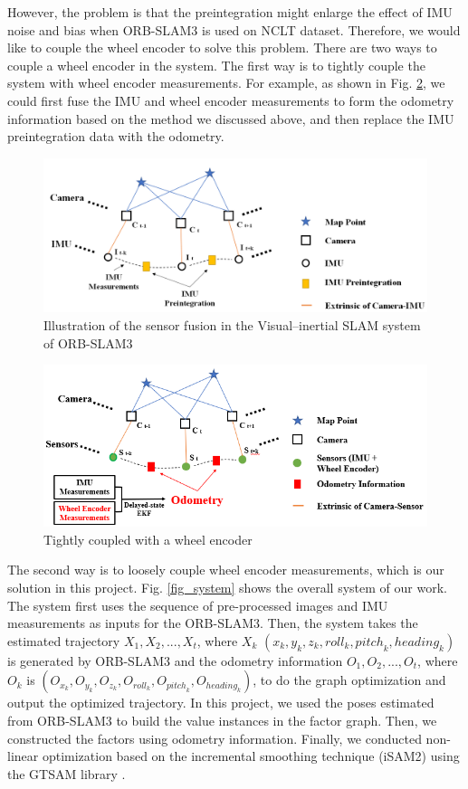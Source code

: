 \documentclass[letterpaper, 10 pt, conference]{ieeeconf}  %
\begin{document}
However, the problem is that the preintegration might enlarge the effect of IMU noise and bias when ORB-SLAM3 is used on NCLT dataset. Therefore, we would like to couple the wheel encoder to solve this problem. There are two ways to couple a wheel encoder in the system. The first way is to tightly couple the system with wheel encoder measurements. For example, as shown in Fig. \ref{fig_tightly}, we could first fuse the IMU and wheel encoder measurements to form the odometry information based on the method we discussed above, and then replace the IMU preintegration data with the odometry. 

\begin{figure}
\centering
\includegraphics[scale=0.35]{Orb_sensor.PNG}
\caption{Illustration of the sensor fusion in the Visual–inertial SLAM system of ORB-SLAM3}
\label{fig_sensor_orbslam3}
\end{figure}

\begin{figure}
\centering
\includegraphics[scale=0.7]{tightly.PNG}
\caption{Tightly coupled with a wheel encoder}
\label{fig_tightly}
\end{figure}

The second way is to loosely couple wheel encoder measurements, which is our solution in this project. Fig. \ref{fig_system} shows the overall system of our work. The system first uses the sequence of pre-processed images and IMU measurements as inputs for the ORB-SLAM3. Then, the system takes the estimated trajectory
$X_1, X_2, ..., X_t$, where $X_k$ $(x_k,y_k,z_k,{roll}_k,{pitch}_k,{heading}_k)$ is generated by ORB-SLAM3 and the odometry information $O_1, O_2, ..., O_t$, where $O_k$ is $(O_{x_k},O_{y_k},O_{z_k},O_{{roll}_k},O_{{pitch}_k},O_{{heading}_k})$, to do the graph optimization and output the optimized trajectory. In this project, we used the poses estimated from ORB-SLAM3 to build the value instances in the factor graph. Then, we constructed the factors using odometry information. Finally, we conducted non-linear optimization based on the incremental smoothing technique (iSAM2) \cite{isam2} using the GTSAM library \cite{gtsam}.
\end{document}
